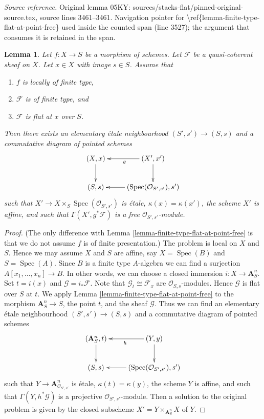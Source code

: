 \documentclass[10pt,a4paper]{amsart}
\theoremstyle{plain}
\newtheorem{lemma}[subsection]{Lemma}
\theoremstyle{definition}
\theoremstyle{remark}
\numberwithin{equation}{subsection}
\def\Spec{\mathop{\mathrm{Spec}}}
\begin{document}
\noindent\textit{Source reference.} Original lemma 05KY: sources/stacks-flat/pinned-original-source.tex, source lines 3461--3461. Navigation pointer for \textbackslash{}ref\{lemma-finite-type-flat-at-point-free\} used inside the counted span (line 3527); the argument that consumes it is retained in the span.\par\medskip
\begin{lemma}
\label{lemma-finite-type-flat-at-point-free-variant}
Let $f : X \to S$ be a morphism of schemes.
Let $\mathcal{F}$ be a quasi-coherent sheaf on $X$.
Let $x \in X$ with image $s \in S$.
Assume that
\begin{enumerate}
\item $f$ is locally of finite type,
\item $\mathcal{F}$ is of finite type, and
\item $\mathcal{F}$ is flat at $x$ over $S$.
\end{enumerate}
Then there exists an elementary \'etale neighbourhood $(S', s') \to (S, s)$
and a commutative diagram of pointed schemes
$$
\xymatrix{
(X, x) \ar[d] & (X', x') \ar[l]^g \ar[d] \\
(S, s) & (\Spec(\mathcal{O}_{S', s'}), s') \ar[l]
}
$$
such that $X' \to X \times_S \Spec(\mathcal{O}_{S', s'})$
is \'etale, $\kappa(x) = \kappa(x')$, the scheme $X'$ is
affine, and such that $\Gamma(X', g^*\mathcal{F})$ is a free
$\mathcal{O}_{S', s'}$-module.
\end{lemma}

\begin{proof}
(The only difference with
Lemma \ref{lemma-finite-type-flat-at-point-free}
is that we do not assume $f$ is of finite presentation.)
The problem is local on $X$ and $S$. Hence we may assume $X$ and
$S$ are affine, say $X = \Spec(B)$ and $S = \Spec(A)$.
Since $B$ is a finite type $A$-algebra we can find a surjection
$A[x_1, \ldots, x_n] \to B$. In other words, we can choose a closed
immersion $i : X \to \mathbf{A}^n_S$. Set $t = i(x)$ and
$\mathcal{G} = i_*\mathcal{F}$. Note that $\mathcal{G}_t \cong \mathcal{F}_x$
are $\mathcal{O}_{S, s}$-modules. Hence $\mathcal{G}$ is flat over $S$ at $t$.
We apply
Lemma \ref{lemma-finite-type-flat-at-point-free}
to the morphism $\mathbf{A}^n_S \to S$, the point $t$, and the
sheaf $\mathcal{G}$. Thus we can find an
elementary \'etale neighbourhood $(S', s') \to (S, s)$
and a commutative diagram of pointed schemes
$$
\xymatrix{
(\mathbf{A}^n_S, t) \ar[d] & (Y, y) \ar[l]^h \ar[d] \\
(S, s) & (\Spec(\mathcal{O}_{S', s'}), s') \ar[l]
}
$$
such that $Y \to \mathbf{A}^n_{\mathcal{O}_{S', s'}}$
is \'etale, $\kappa(t) = \kappa(y)$, the scheme $Y$ is
affine, and such that $\Gamma(Y, h^*\mathcal{G})$ is a projective
$\mathcal{O}_{S', s'}$-module. Then a solution to the original
problem is given by the closed subscheme
$X' = Y \times_{\mathbf{A}^n_S} X$ of $Y$.
\end{proof}
\end{document}
